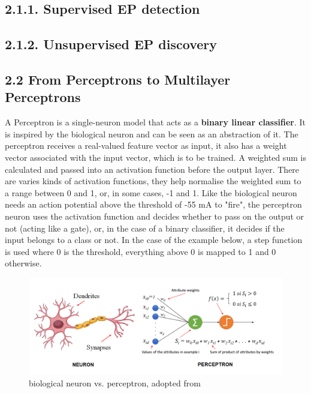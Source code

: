 \documentclass[nobib]{tufte-handout}
\begin{document}
\subsection{2.1.1. Supervised EP detection}
\noindent
\subsection{2.1.2. Unsupervised EP discovery}
\noindent


\subsection{2.2 \textbf{From Perceptrons to Multilayer Perceptrons}}

A Perceptron is a single-neuron model that acts as a \textbf{binary linear classifier}. It is inspired by the biological neuron and can be seen as an abstraction of it. The perceptron receives a real-valued feature vector as input, it also has a weight vector associated with the input vector, which is to be trained. A weighted sum is calculated and passed into an activation function before the output layer. There are varies kinds of activation functions, they help normalise the weighted sum to a range between 0 and 1, or, in some cases, -1 and 1. Like the biological neuron needs an action potential above the threshold of -55 mA to "fire", the perceptron neuron uses the activation function and decides whether to pass on the output or not (acting like a gate), or, in the case of a binary classifier, it decides if the input belongs to a class or not. In the case of the example below, a step function is used where 0 is the threshold, everything above 0 is mapped to 1 and 0 otherwise. 
\begin{figure}
  \includegraphics{perceptron1.png}
  \caption{biological neuron vs. perceptron, adopted from \cite{IF:perceptron}}
\end{figure}
\end{document}
